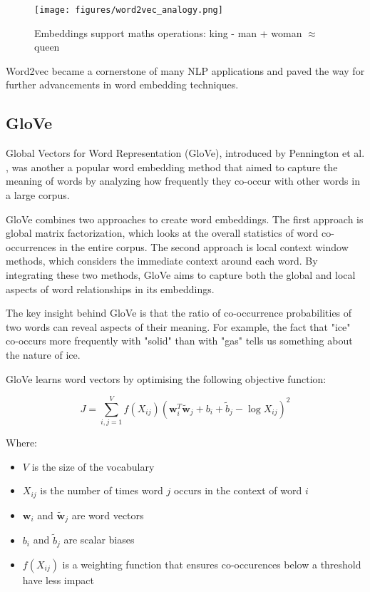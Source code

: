 \documentclass[a4paper, oneside]{discothesis}
\begin{document}
\begin{figure}[h]
    \centering
    \texttt{[image: figures/word2vec\_analogy.png]}
    \caption{Embeddings support maths operations: king - man + woman $\approx$ queen}
    \label{fig:word2vec_analogy}
\end{figure}

Word2vec became a cornerstone of many NLP applications and paved the way for further advancements in word embedding techniques.

\subsection{GloVe}
Global Vectors for Word Representation (GloVe), introduced by Pennington et al. \cite{pennington2014glove}, was another a popular word embedding method that aimed to capture the meaning of words by analyzing how frequently they co-occur with other words in a large corpus.

GloVe combines two approaches to create word embeddings. The first approach is global matrix factorization, which looks at the overall statistics of word co-occurrences in the entire corpus. The second approach is local context window methods, which considers the immediate context around each word. By integrating these two methods, GloVe aims to capture both the global and local aspects of word relationships in its embeddings.

The key insight behind GloVe is that the ratio of co-occurrence probabilities of two words can reveal aspects of their meaning. For example, the fact that "ice" co-occurs more frequently with "solid" than with "gas" tells us something about the nature of ice.

GloVe learns word vectors by optimising the following objective function:

\begin{equation}
J = \sum_{i,j=1}^V f(X_{ij})(\mathbf{w}_i^T\tilde{\mathbf{w}}_j + b_i + \tilde{b}_j - \log X_{ij})^2
\end{equation}

Where:
\begin{itemize}
    \item $V$ is the size of the vocabulary
    \item $X_{ij}$ is the number of times word $j$ occurs in the context of word $i$
    \item $\mathbf{w}_i$ and $\tilde{\mathbf{w}}_j$ are word vectors
    \item $b_i$ and $\tilde{b}_j$ are scalar biases
    \item $f(X_{ij})$ is a weighting function that ensures co-occurences below a threshold have less impact
\end{itemize}
\end{document}
